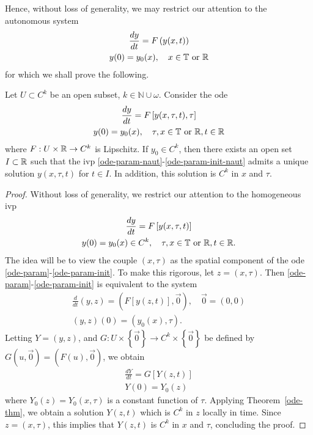 %
%
Hence, without loss of generality, we may restrict our attention to the
autonomous system
%
%
\begin{gather}
\frac{dy}{dt} = F\left( y(x,t) \right)
\label{ode-eq}
\\
y(0) = y_{0}(x), \quad x \in \mathbb{T} \ \text{or} \ \mathbb{R}
\label{ode-init-data}
\end{gather}
%
%
%
for which we shall prove the following.
%
%
%
%
%
%
%
%
%
\begin{corollary}
  \label{cor:reg-param}
  Let $U \subset C^{k}$ be an open subset, $ k \in \mathbb{N} \cup \omega$.  
Consider the ode
\begin{gather}
  \label{ode-param-naut}
\frac{dy}{dt} = F \left [ y(x, \tau, t), \tau \right]
\\
y(0) = y_{0}(x), \quad \tau, x \in \mathbb{T} \ \text{or} \ \mathbb{R}, t \in \mathbb{R}
\label{ode-param-init-naut}
\end{gather}
%
%
where $F: U \times \mathbb{R}  \to C^{k}$ is Lipschitz. If $y_{0} \in C^{k}$, then
there exists an 
open set $I \subset \mathbb{R}$
such that the ivp \eqref{ode-param-naut}-\eqref{ode-param-init-naut}
admits a unique solution $y(x, \tau, t)$ for $t \in I$. In addition,
this solution is $C^{k}$ in $x$ and $\tau$.
%
\end{corollary}
%
\begin{proof}
  Without loss of generality, we restrict our attention to the homogeneous ivp
\begin{gather}
  \label{ode-param}
\frac{dy}{dt} = F \left [ y(x, \tau, t) \right]
\\
y(0) = y_{0}(x) \in C^{k}, \quad \tau, x \in \mathbb{T} \ \text{or} \
\mathbb{R}, t \in \mathbb{R}.
\label{ode-param-init}
\end{gather}
  The idea will be to view the couple
  $(x, \tau)$ as the spatial component of the ode
  \eqref{ode-param}-\eqref{ode-param-init}.
  To make this rigorous, let $z = (x, \tau)$. Then
  \eqref{ode-param}-\eqref{ode-param-init} is equivalent to the system
  \begin{gather*}
    \frac{d}{dt}(y, z) = \left( F[y(z,t)], \vec{0} \right), \quad \vec 0 =
    (0, 0)
  \\
  (y, z)(0) = \left ( y_{0}(x), \tau \right ).
  \end{gather*}
  Letting $Y = (y,z)$, and $G: U \times \left\{ \vec{0} \right\} 
  \to C^{k} \times \left\{ \vec{0} \right\}$ be defined
  by $G(u, \vec{0}) = \left( F(u), \vec{0} \right)$, we obtain
  \begin{gather*}
      \frac{dY}{dt} = G\left[ Y(z,t) \right]
      \\
      Y(0) = Y_{0}(z)
  \end{gather*}
%
where $Y_{0}(z) = Y_{0}(x, \tau)$ is a constant function of $\tau$. 
Applying Theorem~\ref{ode-thm},  we obtain a solution $Y(z,t)$ which is
$C^{k}$ in $z$ locally in time. Since $z = (x, \tau)$, this implies that $Y(z,t)$ is
$C^{k}$ in $x$ and $\tau$, concluding the proof. 
%
\end{proof}
